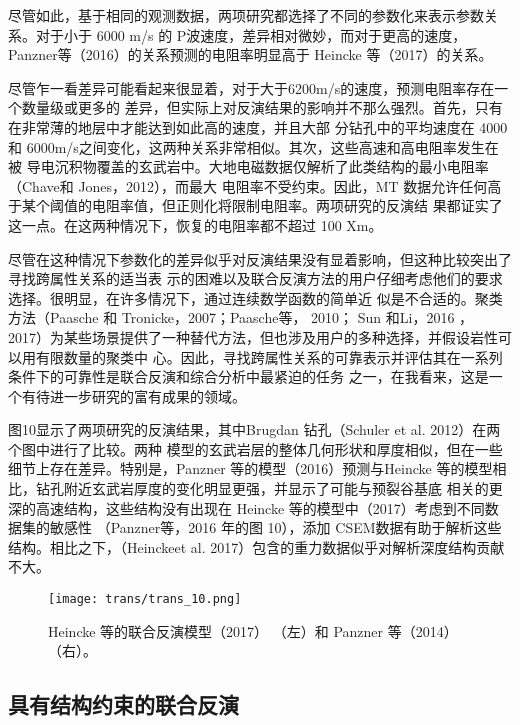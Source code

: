 尽管如此，基于相同的观测数据，两项研究都选择了不同的参数化来表示参数关系。对于小于 6000 m/s 的 P波速度，差异相对微妙，而对于更高的速度，Panzner等（2016）的关系预测的电阻率明显高于 Heincke 等（2017）的关系。

尽管乍一看差异可能看起来很显着，对于大于6200m/s的速度，预测电阻率存在一个数量级或更多的 差异，但实际上对反演结果的影响并不那么强烈。首先，只有在非常薄的地层中才能达到如此高的速度，并且大部 分钻孔中的平均速度在 4000 和 6000m/s之间变化，这两种关系非常相似。其次，这些高速和高电阻率发生在被 导电沉积物覆盖的玄武岩中。大地电磁数据仅解析了此类结构的最小电阻率（Chave和 Jones，2012），而最大 电阻率不受约束。因此，MT 数据允许任何高于某个阈值的电阻率值，但正则化将限制电阻率。两项研究的反演结 果都证实了这一点。在这两种情况下，恢复的电阻率都不超过 100 Xm。

尽管在这种情况下参数化的差异似乎对反演结果没有显着影响，但这种比较突出了寻找跨属性关系的适当表 示的困难以及联合反演方法的用户仔细考虑他们的要求选择。很明显，在许多情况下，通过连续数学函数的简单近 似是不合适的。聚类方法（Paasche 和 Tronicke，2007；Paasche等， 2010； Sun 和Li，2016 ， 2017）为某些场景提供了一种替代方法，但也涉及用户的多种选择，并假设岩性可以用有限数量的聚类中 心。因此，寻找跨属性关系的可靠表示并评估其在一系列条件下的可靠性是联合反演和综合分析中最紧迫的任务 之一，在我看来，这是一个有待进一步研究的富有成果的领域。

图10显示了两项研究的反演结果，其中Brugdan 钻孔（Schuler et al. 2012）在两个图中进行了比较。两种 模型的玄武岩层的整体几何形状和厚度相似，但在一些细节上存在差异。特别是，Panzner 等的模型（2016）预测与Heincke 等的模型相比，钻孔附近玄武岩厚度的变化明显更强，并显示了可能与预裂谷基底 相关的更深的高速结构，这些结构没有出现在 Heincke 等的模型中（2017）考虑到不同数据集的敏感性 （Panzner等，2016 年的图 10），添加 CSEM数据有助于解析这些结构。相比之下，（Heinckeet al. 2017）包含的重力数据似乎对解析深度结构贡献不大。

\begin{figure}[H]
    \centering
    \texttt{[image: trans/trans\_10.png]}
    \caption{Heincke 等的联合反演模型（2017） （左）和 Panzner 等（2014）（右）。}

\end{figure}

\subsection{具有结构约束的联合反演}

